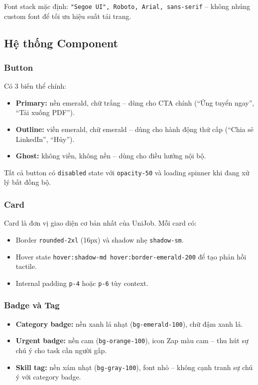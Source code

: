 Font stack mặc định: \texttt{"Segoe UI", Roboto, Arial, sans-serif} -- không nhúng custom
font để tối ưu hiệu suất tải trang.

\subsection{Hệ thống Component}

\subsubsection{Button}

Có 3 biến thể chính:
\begin{itemize}
  \item \textbf{Primary:} nền emerald, chữ trắng -- dùng cho CTA chính (``Ứng tuyển ngay'',
    ``Tải xuống PDF'').
  \item \textbf{Outline:} viền emerald, chữ emerald -- dùng cho hành động thứ cấp
    (``Chia sẻ LinkedIn'', ``Hủy'').
  \item \textbf{Ghost:} không viền, không nền -- dùng cho điều hướng nội bộ.
\end{itemize}

Tất cả button có \texttt{disabled} state với \texttt{opacity-50} và loading spinner khi
đang xử lý bất đồng bộ.

\subsubsection{Card}

Card là đơn vị giao diện cơ bản nhất của UniJob. Mỗi card có:
\begin{itemize}
  \item Border \texttt{rounded-2xl} (16px) và shadow nhẹ \texttt{shadow-sm}.
  \item Hover state \texttt{hover:shadow-md hover:border-emerald-200} để tạo phản hồi tactile.
  \item Internal padding \texttt{p-4} hoặc \texttt{p-6} tùy context.
\end{itemize}

\subsubsection{Badge và Tag}

\begin{itemize}
  \item \textbf{Category badge:} nền xanh lá nhạt (\texttt{bg-emerald-100}), chữ đậm xanh lá.
  \item \textbf{Urgent badge:} nền cam (\texttt{bg-orange-100}), icon Zap màu cam -- thu hút
    sự chú ý cho task cần người gấp.
  \item \textbf{Skill tag:} nền xám nhạt (\texttt{bg-gray-100}), font nhỏ -- không cạnh tranh
    sự chú ý với category badge.
\end{itemize}

